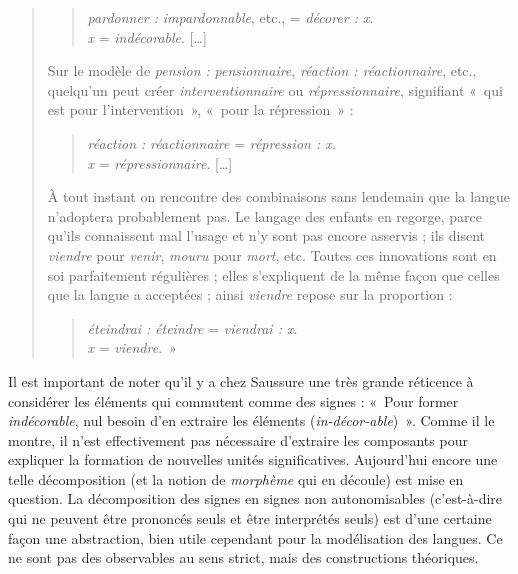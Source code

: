 {\begin{quote}
        \begin{quote}
        \textit{pardonner :} \textit{impardonnable}, etc., = \textit{décorer : x}.\\
        \noindent\textit{x} = \textit{indécorable}. […]
        \end{quote}

    Sur le modèle de \textit{pension :} \textit{pensionnaire}, \textit{réaction : réactionnaire}, etc., quelqu’un peut créer \textit{interventionnaire} ou \textit{répressionnaire}, signifiant «~qui est pour l’intervention~», «~pour la répression~» :
    
        \begin{quote}
        \textit{réaction :} \textit{réactionnaire} = \textit{répression : x.}\\
        \noindent\textit{x} = \textit{répressionnaire}. […]
        \end{quote}

    À tout instant on rencontre des combinaisons sans lendemain que la langue n’adoptera probablement pas. Le langage des enfants en regorge, parce qu’ils connaissent mal l’usage et n’y sont pas encore asservis ; ils disent \textit{viendre} pour \textit{venir}, \textit{mouru} pour \textit{mort}, etc. Toutes ces innovations sont en soi parfaitement régulières ; elles s’expliquent de la même façon que celles que la langue a acceptées ; ainsi \textit{viendre} repose sur la proportion :

    \begin{quote}
    \textit{éteindrai :} \textit{éteindre} = \textit{viendrai : x}.\\
    \noindent\textit{x} = \textit{viendre}.~»
    \end{quote}
    \end{quote}

    Il est important de noter qu’il y a chez Saussure une très grande réticence à considérer les éléments qui commutent comme des signes : «~Pour former \textit{indécorable}, nul besoin d’en extraire les éléments (\textit{in-décor-able})~». Comme il le montre, il n’est effectivement pas nécessaire d’extraire les composants pour expliquer la formation de nouvelles unités significatives. Aujourd’hui encore une telle décomposition (et la notion de \textit{morphème} qui en découle) est mise en question. La décomposition des signes en signes non autonomisables (c’est-à-dire qui ne peuvent être prononcés seuls et être interprétés seuls) est d’une certaine façon une abstraction, bien utile cependant pour la modélisation des langues. Ce ne sont pas des observables au sens strict, mais des constructions théoriques.
}
